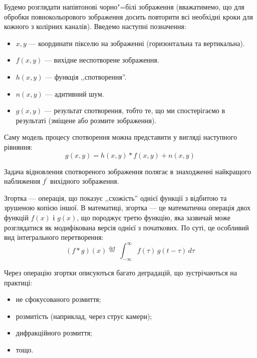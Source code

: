 \documentclass{diploma}
\begin{document}
    Будемо розглядати напівтонові чорно"=білі зображення (вважатимемо, що для
    обробки повнокольорового зображення досить повторити всі необхідні кроки
    для кожного з колірних каналів).
    Введемо наступні позначення:
    \begin{itemize}
      \item $x, y$ --- координати пікселю на зображенні (горизонтальна та
        вертикальна).
      \item $f\left( x, y \right)$ --- вихідне неспотворене зображення.
      \item $h\left( x, y \right)$ --- функція ,,спотворення''.
      \item $n\left( x, y \right)$ --- адитивний шум.
      \item $g\left( x, y \right)$ --- результат спотворення, тобто те, що ми
        спостерігаємо в результаті (зміщене або розмите зображення).
    \end{itemize}

    Саму модель процесу спотворення можна представити у вигляді наступного
    рівняння:
    \begin{equation}
      g\left( x, y \right) = h\left( x, y \right) \ast f\left( x, y \right) +
      n\left( x, y \right)
      \label{eq:model}
    \end{equation}

    Задача відновлення спотвореного зображення полягає в знаходженні
    найкращого наближення $f^\prime$ вихідного зображення.

    Згортка --- операція, що показує ,,схожість'' однієї функції з
    відбитою та зрушеною копією іншої.
    В математиці, згортка --- це математична операція двох функцій $f\left(
    x \right)$ і $g\left( x \right)$, що породжує третю функцію, яка зазвичай
    може розглядатися як модифікована версія однієї з початкових.
    По суті, це особливий вид інтегрального перетворення:
    \begin{equation}
      \left( f * g \right)\left( x \right) \stackrel{\mathrm{def}}{=}\
      \int_{-\infty}^\infty f(\tau)\, g(t - \tau)\, d\tau
      \label{eq:convolution-definition}
    \end{equation}

    Через операцію згортки описуються багато деградацій, що зустрічаються на
    практиці:
    \begin{itemize}
      \item не сфокусованого розмиття;
      \item розмитість (наприклад, через струс камери);
      \item дифракційного розмиття;
      \item тощо.
    \end{itemize}
    \clearpage
\end{document}
